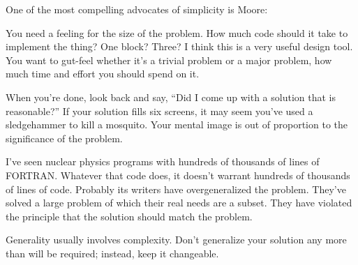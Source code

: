 \begin{interview}
One of the most compelling advocates of simplicity is
Moore:

\begin{tfquot}
You need a feeling for the size of the problem. How much code should
it take to implement the thing? One block? Three? I think this is a
very useful design tool. You want to gut-feel whether it's a trivial
problem or a major problem, how much time and effort you should spend
on it.

When you're done, look back and say, ``Did I come up with a solution
that is reasonable?'' If your solution fills six screens, it may seem
you've used a sledgehammer to kill a mosquito. Your mental image is
out of proportion to the significance of the problem.

I've seen nuclear physics programs with hundreds of thousands of lines
of FORTRAN. Whatever that code does, it doesn't warrant hundreds of
thousands of lines of code. Probably its writers have overgeneralized
the problem. They've solved a large problem of which their real needs
are a subset. They have violated the principle that the solution
should match the problem.
\end{tfquot}
\end{interview}

\begin{tip}
Generality usually involves complexity. Don't generalize your solution any
more than will be required; instead, keep it changeable.
\end{tip}

